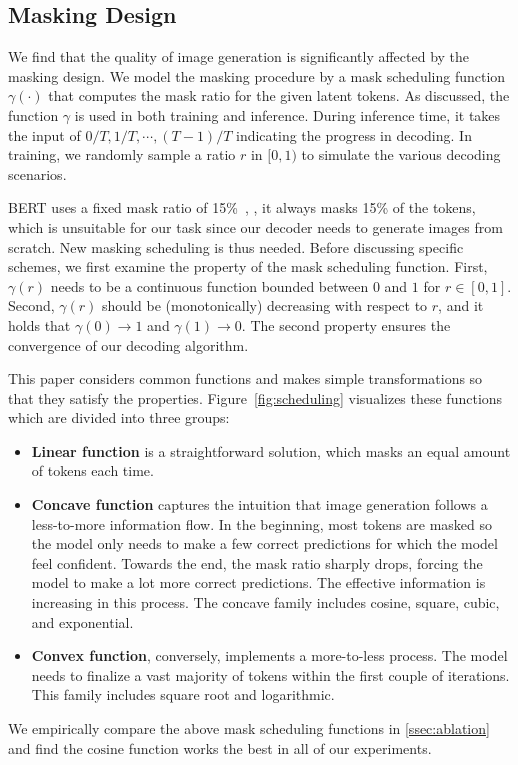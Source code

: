 \subsection{Masking Design}
\label{ssec:masking}

We find that the quality of image generation is significantly affected by the masking design. We model the masking procedure by a mask scheduling function $\gamma (\cdot)$ that computes the mask ratio for the given latent tokens. As discussed, the function $\gamma$ is used in both training and inference. During inference time, it takes the input of $0/T, 1/T, \cdots, (T-1)/T$ indicating the progress in decoding. In training, we randomly sample a ratio $r$ in $[0,1)$ to simulate the various decoding scenarios.

BERT uses a fixed mask ratio of 15\%~\cite{Devlin19bert}, \ie, it always masks 15\% of the tokens, which is unsuitable for our task since our decoder needs to generate images from scratch. New masking scheduling is thus needed. Before discussing specific schemes, we first examine the property of the mask scheduling function. First, $\gamma(r)$ needs to be a continuous function bounded between $0$ and $1$ for $r \in [0,1]$. Second, $\gamma(r)$ should be (monotonically) decreasing with respect to $r$, and it holds that $\gamma(0)\rightarrow1$ and $\gamma(1)\rightarrow0$. 
The second property ensures the convergence of our decoding algorithm.


This paper considers common functions and makes simple transformations so that they satisfy the properties. Figure~\ref{fig:scheduling} visualizes these functions which are divided into three groups:
\begin{itemize}
    \vspace{-2mm}
    \item \textbf{Linear function} is a straightforward solution, which masks an equal amount of tokens each time.
    \vspace{-2mm}
    \item \textbf{Concave function} captures the intuition that image generation follows a less-to-more information flow. In the beginning, most tokens are masked so the model only needs to make a few correct predictions for which the model feel confident. Towards the end, the mask ratio sharply drops, forcing the model to make a lot more correct predictions. The effective information is increasing in this process. The concave family includes cosine, square, cubic, and exponential.
    \vspace{-2mm}
    \item \textbf{Convex function}, conversely, implements a more-to-less process. The model needs to finalize a vast majority of tokens within the first couple of iterations. This family includes square root and logarithmic.
    
    \vspace{-2mm}
\end{itemize}

We empirically compare the above mask scheduling functions in \ref{ssec:ablation} and find the $\text{cosine}$ function works the best in all of our experiments.